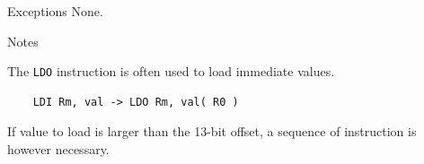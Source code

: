 \begin{iPageDescEntry}{Exceptions}
None.
\end{iPageDescEntry}

\begin{iPageDescEntry}{Notes}

The \texttt{LDO} instruction is often used to load immediate values. 

\begin{verbatim}
    LDI Rm, val -> LDO Rm, val( R0 )
\end{verbatim}

If value to load is larger than the 13-bit offset, a sequence of instruction is however necessary.

\end{iPageDescEntry}



